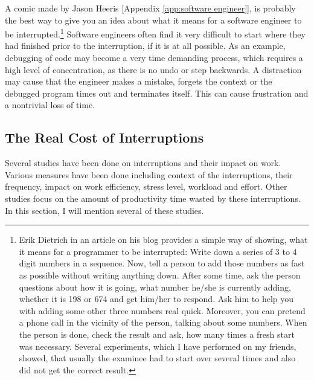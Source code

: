 \documentclass[11pt,singleside]{myfithesis2}
\begin{document}
A comic made by Jason Heeris [Appendix \ref{app:software engineer}],  is probably the best way to give you an idea about what it means for a software engineer to be interrupted.\footnote{Erik Dietrich in an article on his blog \cite{costOfInterruptions} provides a simple way of showing, what it means for a programmer to be interrupted: Write down a series of 3 to 4 digit numbers in a sequence. Now, tell a person to add those numbers as fast as possible without writing anything down. After some time, ask the person questions about how it is going, what number he/she is currently adding, whether it is 198 or 674 and get him/her to respond. Ask him to help you with adding some other three numbers real quick. Moreover, you can pretend a phone call in the vicinity of the person, talking about some numbers. When the person is done, check the result and ask, how many times a fresh start was necessary. Several experiments, which I have performed on my friends, showed, that usually the examinee had to start over several times and also did not get the correct result.} Software engineers often find it very difficult to start where they had finished prior to the interruption, if it is at all possible. As an example, debugging of code may become a very time demanding process, which requires a high level of concentration, as there is no undo or step backwards. A distraction may cause that the engineer makes a mistake, forgets the context or the debugged program times out and terminates itself. This can cause frustration and a nontrivial loss of time.



		\subsection{The Real Cost of Interruptions }
Several studies \cite{studySpeedAndStress, studyAttention, studyDealingWithInterruptions, studyResumptionStrategies} have been done on interruptions and their impact on work. Various measures have been done including context of the interruptions, their frequency, impact on work efficiency, stress level, workload and effort. Other studies focus on the amount of productivity time wasted by these interruptions. In this section, I will mention several of these studies.
\end{document}
